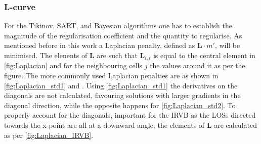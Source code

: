 \subsubsection{L-curve}
For the Tikinov, SART, and Bayesian algorithms one has to establish the magnitude of the regularisation coefficient and the quantity to regularise. As mentioned before in this work a Laplacian penalty, defined as $\bm{L}\cdot m'$, will be minimised. The elenents of $\bm{L}$ are such that $\bm{L}_{i,i}$ is equal to the central element in \autoref{fig:Laplacian} and for the neighbouring cells $j$ the values around it as per the figure. The more commonly used Laplacian penalties are as shown in \autoref{fig:Laplacian_std1} and .\cite{Fisher2004} Using \autoref{fig:Laplacian_std1} the derivatives on the diagonals are not calculated, favouring solutions with larger gradients in the diagonal direction, while the opposite happens for \autoref{fig:Laplacian_std2}. To properly account for the diagonals, important for the IRVB as the LOSs directed towards the x-point are all at a downward angle, the elements of $\bm{L}$ are calculated as per \autoref{fig:Laplacian_IRVB}.

